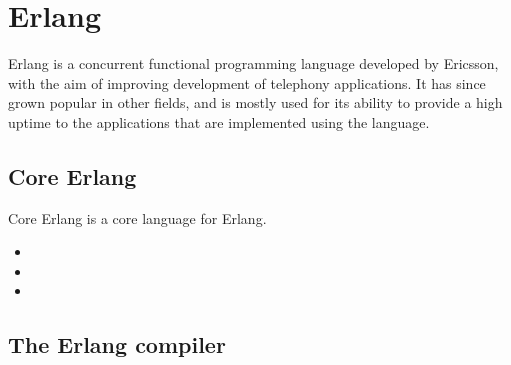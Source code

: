 \section{Erlang}

Erlang is a concurrent functional programming language developed by Ericsson, with the aim of improving
development of telephony applications. It has since grown popular in other fields, and is mostly used
for its ability to provide a high uptime to the applications that are implemented using the language.

\subsection{Core Erlang}
Core Erlang \cite{CoreErlangIntro} is a core language for Erlang.
\begin{itemize}
  \item {}
  \item {}
  \item {}
\end{itemize}

\subsection{The Erlang compiler}
